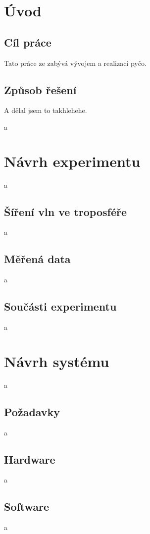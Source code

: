 \documentclass[twoside]{ctuthesis}
\theoremstyle{plain}
\theoremstyle{definition}
\theoremstyle{note}
\begin{document}
\maketitle

\chapter{Úvod}

\section{Cíl práce}

Tato práce ze zabývá vývojem a realizací pyčo.

\section{Způsob řešení}

A dělal jsem to takhlehehe.


a
\chapter{Návrh experimentu}
a

\section{Šíření vln ve troposféře}
a

\section{Měřená data}
a

\section{Součásti experimentu}
a

\chapter{Návrh systému}
a
\section{Požadavky}
a
\section{Hardware}
a
\section{Software}
a
\end{document}
